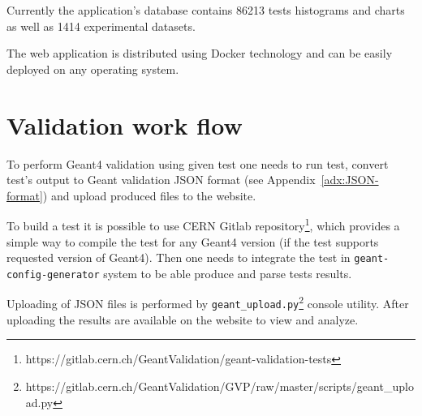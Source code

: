 Currently the application's database contains 86213 tests histograms and charts as well as 1414 experimental datasets.

The web application is distributed using Docker technology and can be easily deployed on any operating system.

\section{Validation work flow}
\label{sec-workflow}

To perform Geant4 validation using given test one needs to run test, convert test's output to Geant validation JSON format (see Appendix~\ref{adx:JSON-format}) and upload produced files to the website.

To build a test it is possible to use CERN Gitlab repository\footnote{https://gitlab.cern.ch/GeantValidation/geant-validation-tests}, which provides a simple way to compile the test for any Geant4 version (if the test supports requested version of Geant4).
Then one needs to integrate the test in {\tt geant-config-generator} system to be able produce and parse tests results.

Uploading of JSON files is performed by {\tt geant\_upload.py}\footnote{https://gitlab.cern.ch/GeantValidation/GVP/raw/master/scripts/geant\_upload.py} console utility.
After uploading the results are available on the website to view and analyze.




